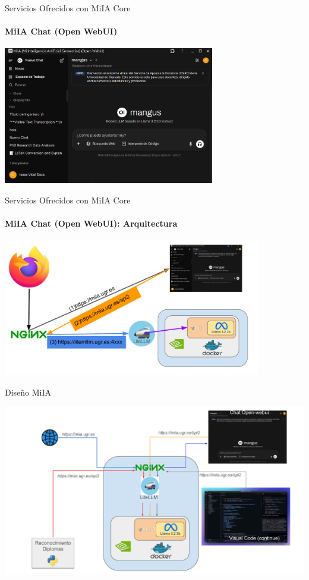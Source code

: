 \documentclass[aspectratio=169]{beamer}
\begin{document}
\begin{frame}{Servicios Ofrecidos con MiIA Core}
    \framesubtitle{MiIA Chat (\textbf{Open WebUI})}

    \begin{center}
        \includegraphics[height=6cm]{imagenes/MiIA_chat.png}
    \end{center}

\end{frame}

\begin{frame}{Servicios Ofrecidos con MiIA Core}
    \framesubtitle{MiIA Chat (\textbf{Open WebUI}): Arquitectura}

    \begin{center}
        \includegraphics[height=6cm]{imagenes/MiIA_chat_arch.pdf}
    \end{center}

\end{frame}

\begin{frame}{Diseño MiIA}

        \begin{center}
            \includegraphics[width=14cm]{imagenes/MiIA_completo.pdf}
        \end{center}


\end{frame}
\end{document}

